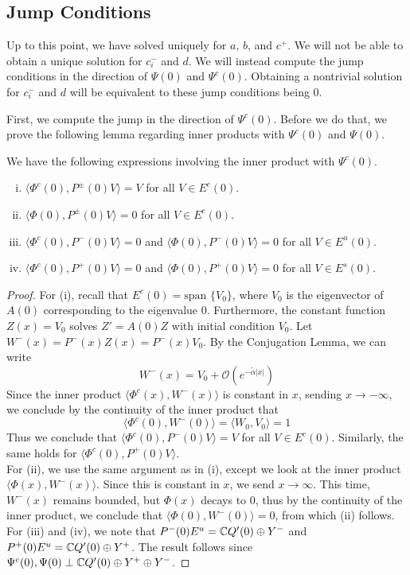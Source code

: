 \documentclass[thesis.tex]{subfiles}
\begin{document}
\subsection{Jump Conditions}
Up to this point, we have solved uniquely for $a$, $b$, and $c^+$. We will not be able to obtain a unique solution for $c_i^-$ and $d$. We will instead compute the jump conditions in the direction of $\Psi(0)$ and $\Psi^c(0)$. Obtaining a nontrivial solution for $c_i^-$ and $d$ will be equivalent to these jump conditions being 0.

First, we compute the jump in the direction of $\Psi^c(0)$. Before we do that, we prove the following lemma regarding inner products with $\Psi^c(0)$ and $\Psi(0)$.

\begin{lemma}\label{PsiIP}
We have the following expressions involving the inner product with $\Psi^c(0)$.
\begin{enumerate}[(i)]
	\item $\langle \Phi^c(0), P^\pm(0) V \rangle = V$ for all $V \in E^c(0)$.
	\item $\langle \Phi(0), P^\pm(0) V \rangle = 0$ for all $V \in E^c(0)$.
	\item $\langle \Phi^c(0), P^-(0) V \rangle = 0$ and $\langle \Phi(0), P^-(0) V \rangle = 0$ for all $V \in E^u(0)$.
	\item $\langle \Phi^c(0), P^+(0) V \rangle = 0$ and $\langle \Phi(0), P^+(0) V \rangle = 0$ for all $V \in E^s(0)$.
\end{enumerate}
\begin{proof}
For (i), recall that $E^c(0) = \text{span }\{ V_0 \}$, where $V_0$ is the eigenvector of $A(0)$ corresponding to the eigenvalue 0. Furthermore, the constant function $Z(x) = V_0$ solves $Z' = A(0) Z$ with initial condition $V_0$. Let $W^-(x) = P^-(x) Z(x) = P^-(x) V_0$. By the Conjugation Lemma, we can write
\[
W^-(x) = V_0 + \mathcal{O}({e^{-\tilde{\alpha}|x|}})
\]
Since the inner product $\langle \Phi^c(x), W^-(x) \rangle$ is constant in $x$, sending $x \rightarrow -\infty$, we conclude by the continuity of the inner product that
\[
\langle \Phi^c(0), W^-(0) \rangle = \langle W_0, V_0 \rangle = 1 
\]
Thus we conclude that $\langle \Phi^c(0), P^-(0) V \rangle = V$ for all $V \in E^c(0)$. Similarly, the same holds for $\langle \Phi^c(0), P^+(0) V \rangle$.\\

For (ii), we use the same argument as in (i), except we look at the inner product $\langle \Phi(x), W^-(x) \rangle$. Since this is constant in $x$, we send $x \rightarrow \infty$. This time, $W^-(x)$ remains bounded, but $\Phi(x)$ decays to 0, thus by the continuity of the inner product, we conclude that $\langle \Phi(0), W^-(0) \rangle = 0$, from which (ii) follows.\\

For (iii) and (iv), we note that $P^-(0)E^u = {\mathbb C} Q'(0) \oplus Y^-$ and $P^+(0)E^u = {\mathbb C} Q'(0) \oplus Y^+$. The result follows since $\Psi^c(0), \Psi(0) \perp {\mathbb C} Q'(0) \oplus Y^+ \oplus Y^-$.
\end{proof}
\end{lemma}
\end{document}
